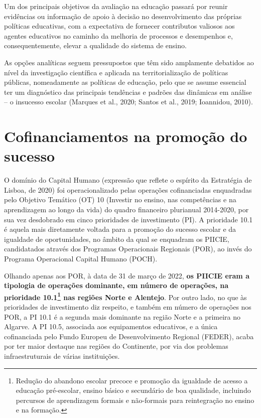 \documentclass[
]{book}
\begin{document}
Um dos principais objetivos da avaliação na educação passará por reunir evidências ou informação de apoio à decisão no desenvolvimento das próprias políticas educativas, com a expectativa de fornecer contributos valiosos aos agentes educativos no caminho da melhoria de processos e desempenhos e, consequentemente, elevar a qualidade do sistema de ensino.

As opções analíticas seguem pressupostos que têm sido amplamente debatidos ao nível da investigação científica e aplicada na territorialização de políticas públicas, nomeadamente as políticas de educação, pelo que se assume essencial ter um diagnóstico das principais tendências e padrões das dinâmicas em análise -- o insucesso escolar (Marques et al., 2020; Santos et al., 2019; Ioannidou, 2010).

\hypertarget{cofinanciamentos-na-promouxe7uxe3o-do-sucesso}{%
\section{Cofinanciamentos na promoção do sucesso}\label{cofinanciamentos-na-promouxe7uxe3o-do-sucesso}}

O domínio do Capital Humano (expressão que reflete o espírito da Estratégia de Lisboa, de 2020) foi operacionalizado pelas operações cofinanciadas enquadradas pelo Objetivo Temático (OT) 10 (Investir no ensino, nas competências e na aprendizagem ao longo da vida) do quadro financeiro plurianual 2014-2020, por sua vez desdobrado em cinco prioridades de investimento (PI). A prioridade 10.1 é aquela mais diretamente voltada para a promoção do sucesso escolar e da igualdade de oportunidades, no âmbito da qual se enquadram os PIICIE, candidatados através dos Programas Operacionais Regionais (POR), ao invés do Programa Operacional Capital Humano (POCH).

Olhando apenas aos POR, à data de 31 de março de 2022, \textbf{os PIICIE eram a tipologia de operações dominante, em número de operações, na prioridade 10.1\footnote{Redução do abandono escolar precoce e promoção da igualdade de acesso a educação pré-escolar, ensino básico e secundário de boa qualidade, incluindo percursos de aprendizagem formais e não-formais para reintegração no ensino e na formação.} nas regiões Norte e Alentejo}. Por outro lado, no que às prioridades de investimento diz respeito, e também em número de operações nos POR, a PI 10.1 é a segunda mais dominante na região Norte e a primeira no Algarve. A PI 10.5, associada aos equipamentos educativos, e a única cofinanciada pelo Fundo Europeu de Desenvolvimento Regional (FEDER), acaba por ter maior destaque nas regiões do Continente, por via dos problemas infraestruturais de várias instituições.
\end{document}
